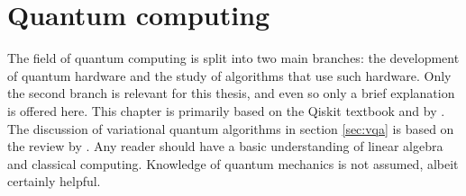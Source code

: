 \chapter{Quantum computing}
\label{chap:qc}
The field of quantum computing is split into two main branches: the development of quantum hardware and the study of algorithms that use such hardware.
Only the second branch is relevant for this thesis, and even so only a brief explanation is offered here.
This chapter is primarily based on the Qiskit textbook \cite{qiskit_textbook} and  by \textcite{textbook_2nd}.
The discussion of variational quantum algorithms in section \ref{sec:vqa} is based on the review by \textcite{cerezo2021}.
Any reader should have a basic understanding of linear algebra and classical computing.
Knowledge of quantum mechanics is not assumed, albeit certainly helpful.









